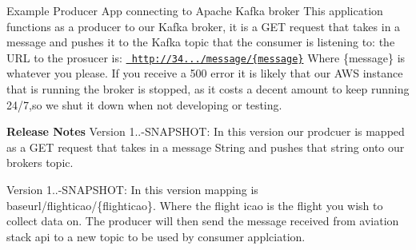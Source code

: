 Example Producer App connecting to Apache Kafka broker This application functions as a producer to our Kafka broker, it is a GET request that takes in a message and pushes it to the Kafka topic that the consumer is listening to\+: the URL to the prosucer is\+: \href{http://34.198.166.4/message/{message}}{\texttt{ http\+://34.../message/\{message\}}} Where \textquotesingle{}\{message\}\textquotesingle{} is whatever you please. If you receive a 500 error it is likely that our AWS instance that is running the broker is stopped, as it costs a decent amount to keep running 24/7,so we shut it down when not developing or testing.

{\bfseries{Release Notes}} Version 1..-\/SNAPSHOT\+: In this version our prodcuer is mapped as a GET request that takes in a message String and pushes that string onto our broker\textquotesingle{}s topic.

Version 1..-\/SNAPSHOT\+: In this version mapping is baseurl/flighticao/\{flighticao\}. Where the flight icao is the flight you wish to collect data on. The producer will then send the message received from aviation stack api to a new topic to be used by consumer applciation. 